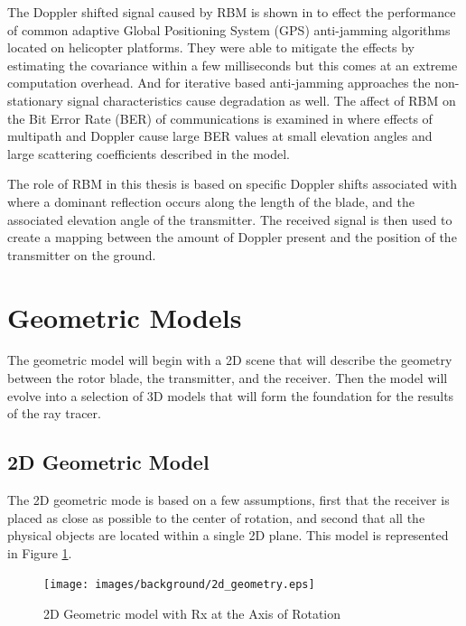 The Doppler shifted signal caused by RBM is shown in \cite{F.BarbieroF.VincentT.Deloues2014} to effect the performance of common adaptive Global Positioning System (GPS) anti-jamming algorithms located on helicopter platforms. They were able to mitigate the effects by estimating the covariance within a few milliseconds but this comes at an extreme computation overhead. And for iterative based anti-jamming approaches the non-stationary signal characteristics cause degradation as well. The affect of RBM on the Bit Error Rate (BER) of communications is examined in \cite{YiminZhang2000} where effects of multipath and Doppler cause large BER values at small elevation angles and large scattering coefficients described in the model.

The role of RBM in this thesis is based on specific Doppler shifts associated with where a dominant reflection occurs along the length of the blade, and the associated elevation angle of the transmitter. The received signal is then used to create a mapping between the amount of Doppler present and the position of the transmitter on the ground.

\section{Geometric Models}
The geometric model will begin with a 2D scene that will describe the geometry between the rotor blade, the transmitter, and the receiver. Then the model will evolve into a selection of 3D models that will form the foundation for the results of the ray tracer.

\subsection{2D Geometric Model}
The 2D geometric mode is based on a few assumptions, first that the receiver is placed as close as possible to the center of rotation, and second that all the physical objects are located within a single 2D plane. This model is represented in Figure \ref{fig:2D_model}.

\begin{figure}[h]
	\begin{center}
		\texttt{[image: images/background/2d\_geometry.eps]}
		\caption{2D Geometric model with Rx at the Axis of Rotation}
		\label{fig:2D_model}
	\end{center}
\end{figure}

